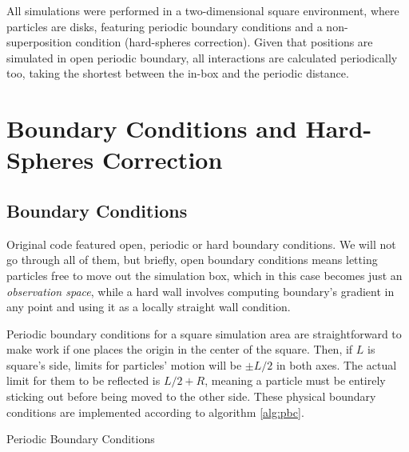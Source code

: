\documentclass[../../master_thesis_np.tex]{subfiles}
\begin{document}
	All simulations were performed in a two-dimensional square environment, where particles are disks, featuring periodic boundary conditions and a non-superposition condition (hard-spheres correction). 
	Given that positions are simulated in open periodic boundary, all interactions are calculated periodically too, taking the shortest between the in-box and the periodic distance.
	
	\section{Boundary Conditions and Hard-Spheres Correction}
	\subsection{Boundary Conditions}
	Original code featured open, periodic or hard boundary conditions. 
	We will not go through all of them, but briefly, open boundary conditions means letting particles free to move out the simulation box, which in this case becomes just an \emph{observation space}, while a hard wall involves computing boundary's gradient in any point and using it as a locally straight wall condition.
	
	Periodic boundary conditions for a square simulation area are straightforward to make work if one places the origin in the center of the square. 
	Then, if $L$ is square's side, limits for particles' motion will be $\pm L/2$ in both axes. 
	The actual limit for them to be reflected is $L/2 + R$, meaning a particle must be entirely sticking out before being moved to the other side. %
	These physical boundary conditions are implemented according to algorithm \ref{alg:pbc}.
	
	\begin{algorithm}[htp]
		\caption{Periodic Boundary Conditions} \label{alg:pbc}	
		\begin{algorithmic}[1]
			\EndIf
			\EndIf
			\EndFor
		\end{algorithmic}
	\end{algorithm}
	
\end{document}
